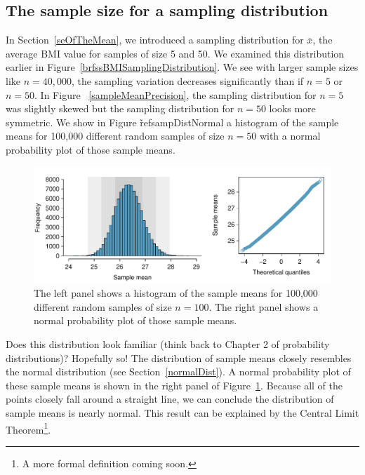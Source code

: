 \subsection{The sample size for a sampling distribution}
\label{sampdistmean}

In Section~\ref{seOfTheMean}, we introduced a sampling distribution for $\bar{x}$, the average BMI value for samples of size 5 and 50. We examined this distribution earlier in Figure~\ref{brfssBMISamplingDistribution}. We see with larger sample sizes like $n=40,000$, the sampling variation decreases significantly than if $n=5$ or $n=50$. In Figure ~\ref{sampleMeanPrecision}, the sampling distribution for $n=5$ was slightly skewed but the sampling distribution for $n=50$ looks more symmetric. We show in Figure \~ref{sampDistNormal} a histogram of the sample means for 100,000 different random samples of size $n=50$ with a normal probability plot of those sample means. 

\begin{figure}[hht]
   \centering
   \includegraphics[width=\textwidth]{ch_inference_foundations_oi_biostat/figures/sampDistNormal/sampDistNormal}
   \caption{The left panel shows a histogram of the sample means for 100,000 different random samples of size $n=100$. The right panel shows a normal probability plot of those sample means.}
   \label{sampDistNormal}
\end{figure}

Does this distribution look familiar (think back to Chapter 2 of probability distributions)? Hopefully so! The distribution of sample means closely resembles the normal distribution (see Section~\ref{normalDist}). A normal probability plot of these sample means is shown in the right panel of Figure~\ref{sampDistNormal}. Because all of the points closely fall around a straight line, we can conclude the distribution of sample means is nearly normal. This result can be explained by the Central Limit Theorem\footnote{A more formal definition coming soon.}.

